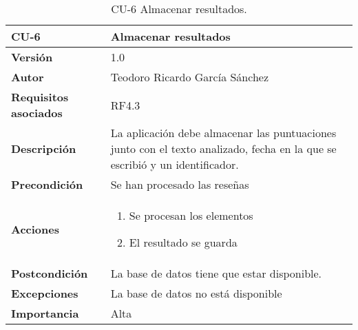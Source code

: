 \begin{table}[p]
	\centering
	\begin{tabularx}{\linewidth}{ p{} p{} }
		\toprule
		\textbf{CU-6}    & \textbf{Almacenar resultados}\\
		\toprule
		\textbf{Versión}              & 1.0    \\
		\textbf{Autor}                & Teodoro Ricardo García Sánchez \\
		\textbf{Requisitos asociados} & RF4.3 \\
		\textbf{Descripción}          & La aplicación debe almacenar las puntuaciones junto con el texto analizado, fecha en la que se escribió y un identificador. \\
		\textbf{Precondición}         & Se han procesado las reseñas \\
		\textbf{Acciones}             &
		\begin{enumerate}
			\def\labelenumi{\arabic{enumi}.}
			\tightlist
			\item Se procesan los elementos
			\item El resultado se guarda
		\end{enumerate}\\
		\textbf{Postcondición}        & La base de datos tiene que estar disponible.\\
		\textbf{Excepciones}          & La base de datos no está disponible \\
		\textbf{Importancia}          & Alta \\
		\bottomrule
	\end{tabularx}
	\caption{CU-6 Almacenar resultados.}
\end{table}
